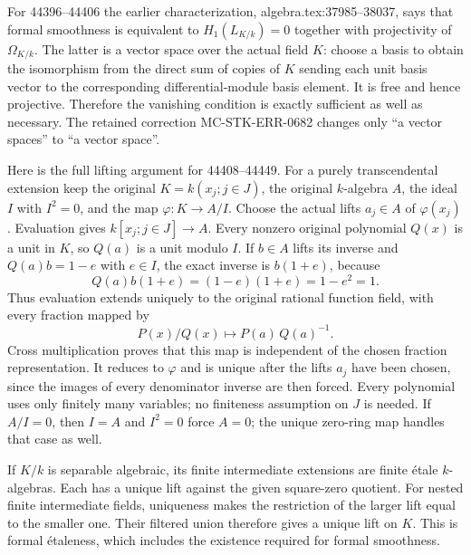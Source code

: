 For 44396--44406 the earlier characterization, algebra.\AlgebraIdentifierBreak{}tex:\AlgebraIdentifierBreak{}37985--\AlgebraIdentifierBreak{}38037, says that formal smoothness is equivalent to \(H_1(L_{K/k})=0\) together with projectivity of \(\Omega_{K/k}\). The latter is a vector space over the actual field \(K\): choose a basis to obtain the isomorphism from the direct sum of copies of \(K\) sending each unit basis vector to the corresponding differential-module basis element. It is free and hence projective. Therefore the vanishing condition is exactly sufficient as well as necessary. The retained correction MC-\AlgebraIdentifierBreak{}STK-\AlgebraIdentifierBreak{}ERR-\AlgebraIdentifierBreak{}0682 changes only ``a vector spaces'' to ``a vector space''.

Here is the full lifting argument for 44408--44449. For a purely transcendental extension keep the original \(K=k(x_j;j\in J)\), the original \(k\)-algebra \(A\), the ideal \(I\) with \(I^2=0\), and the map \(\varphi:K\to A/I\). Choose the actual lifts \(a_j\in A\) of \(\varphi(x_j)\). Evaluation gives \(k[x_j;j\in J]\to A\). Every nonzero original polynomial \(Q(x)\) is a unit in \(K\), so \(Q(a)\) is a unit modulo \(I\). If \(b\in A\) lifts its inverse and \(Q(a)b=1-e\) with \(e\in I\), the exact inverse is \(b(1+e)\), because \[
 Q(a)b(1+e)=(1-e)(1+e)=1-e^2=1.
\] Thus evaluation extends uniquely to the original rational function field, with every fraction mapped by \[
 P(x)/Q(x)\longmapsto P(a)\,Q(a)^{-1}.
\] Cross multiplication proves that this map is independent of the chosen fraction representation. It reduces to \(\varphi\) and is unique after the lifts \(a_j\) have been chosen, since the images of every denominator inverse are then forced. Every polynomial uses only finitely many variables; no finiteness assumption on \(J\) is needed. If \(A/I=0\), then \(I=A\) and \(I^2=0\) force \(A=0\); the unique zero-ring map handles that case as well.

If \(K/k\) is separable algebraic, its finite intermediate extensions are finite étale \(k\)-algebras. Each has a unique lift against the given square-zero quotient. For nested finite intermediate fields, uniqueness makes the restriction of the larger lift equal to the smaller one. Their filtered union therefore gives a unique lift on \(K\). This is formal étaleness, which includes the existence required for formal smoothness.

